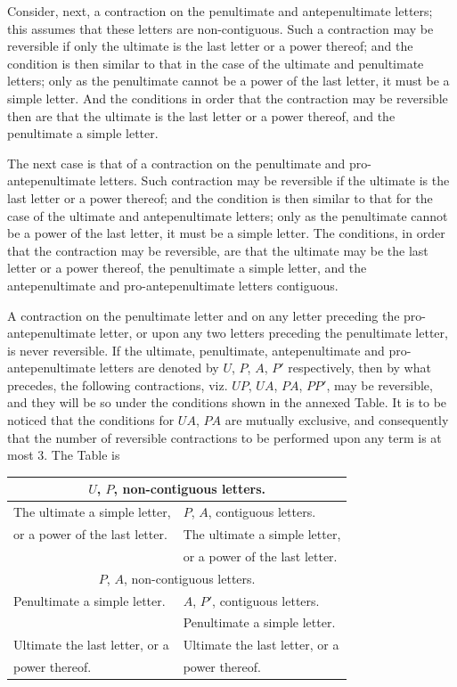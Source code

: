 \documentclass[11pt,a4paper]{book}
\begin{document}
Consider, next, a contraction on the penultimate and antepenultimate letters; this assumes that these letters are non-contiguous. Such a contraction may be reversible if only the ultimate is the last letter or a power thereof; and the condition is then similar to that in the case of the ultimate and penultimate letters; only as the penultimate cannot be a power of the last letter, it must be a simple letter. And the conditions in order that the contraction may be reversible then are that the ultimate is the last letter or a power thereof, and the penultimate a simple letter.

The next case is that of a contraction on the penultimate and pro-antepenultimate letters. Such contraction may be reversible if the ultimate is the last letter or a power thereof; and the condition is then similar to that for the case of the ultimate and antepenultimate letters; only as the penultimate cannot be a power of the last letter, it must be a simple letter. The conditions, in order that the contraction may be reversible, are that the ultimate may be the last letter or a power thereof, the penultimate a simple letter, and the antepenultimate and pro-antepenultimate letters contiguous.

A contraction on the penultimate letter and on any letter preceding the pro-antepenultimate letter, or upon any two letters preceding the penultimate letter, is never reversible. If the ultimate, penultimate, antepenultimate and pro-antepenultimate letters are denoted by $U$, $P$, $A$, $P'$ respectively, then by what precedes, the following contractions, viz. $UP$, $UA$, $PA$, $PP'$, may be reversible, and they will be so under the conditions shown in the annexed Table. It is to be noticed that the conditions for $UA$, $PA$ are mutually exclusive, and consequently that the number of reversible contractions to be performed upon any term is at most 3. The Table is

\begin{center}
\begin{tabular}{|l|l|}
\hline
\multicolumn{2}{|c|}{$U$, $P$, non-contiguous letters.} \\
\hline
The ultimate a simple letter, & $P$, $A$, contiguous letters. \\
or a power of the last letter. & The ultimate a simple letter, \\
& or a power of the last letter. \\
\hline
\multicolumn{2}{|c|}{$P$, $A$, non-contiguous letters.} \\
\hline
Penultimate a simple letter. & $A$, $P'$, contiguous letters. \\
& Penultimate a simple letter. \\
Ultimate the last letter, or a & Ultimate the last letter, or a \\
power thereof. & power thereof. \\
\hline
\end{tabular}
\end{center}
\end{document}
